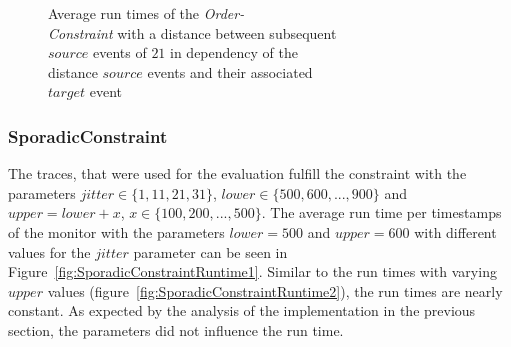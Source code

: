 \begin{figure}
\begin{minipage}{0.45\textwidth}
		\centering
		\caption{Average run times of the \textit{Order-\\Constraint} with a distance between subsequent\\ $source$ events of $21$ in dependency of the\\ distance $source$ events and their associated\\ $target$ event}
		\label{fig:OrderConstraintRunTime2}
	\end{minipage}
\end{figure}

\subsubsection{SporadicConstraint}
The traces, that were used for the evaluation fulfill the constraint with the parameters $jitter\in\{1,11,21,31\}$, $lower\in\{500,600,...,900\}$ and $upper=lower+x$, $x\in\{100, 200, ..., 500\}$. The average run time per timestamps of the monitor with the parameters $lower=500$ and $upper=600$ with different values for the $jitter$ parameter can be seen in Figure~\ref{fig:SporadicConstraintRuntime1}. Similar to the run times with varying $upper$ values (figure~\ref{fig:SporadicConstraintRuntime2}), the run times are nearly constant. As expected by the analysis of the implementation in the previous section, the parameters did not influence the run time.

